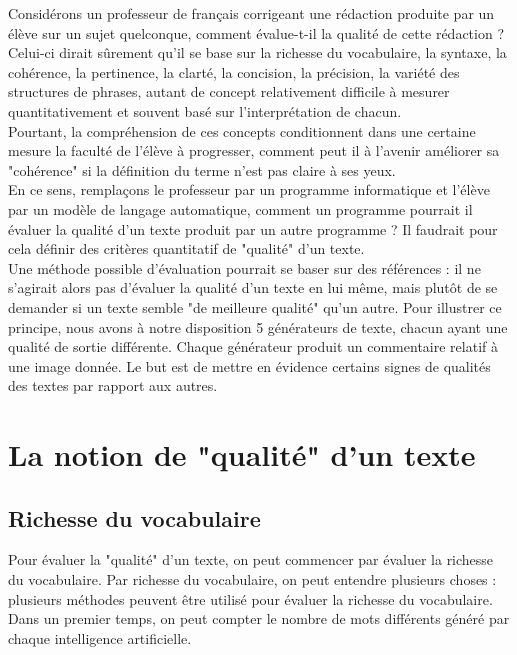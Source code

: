 \documentclass[conference]{IEEEtran}
\begin{document}
Considérons un professeur de français corrigeant une rédaction produite par un élève sur un sujet quelconque, comment évalue-t-il la qualité de cette rédaction ? 
Celui-ci dirait sûrement qu'il se base sur la richesse du vocabulaire, la syntaxe, la cohérence, la pertinence, la clarté, la concision, la précision, la variété des structures de phrases, autant de concept relativement difficile à mesurer quantitativement et souvent basé sur l'interprétation de chacun. \\

Pourtant, la compréhension de ces concepts conditionnent dans une certaine mesure la faculté de l'élève à progresser, comment peut il à l'avenir améliorer sa "cohérence" si la définition du terme n'est pas claire à ses yeux.\\

En ce sens, remplaçons le professeur par un programme informatique et l'élève par un modèle de langage automatique, comment un programme pourrait il évaluer la qualité d'un texte produit par un autre programme ?
Il faudrait pour cela définir des critères quantitatif de "qualité" d'un texte.\\

Une méthode possible d'évaluation pourrait se baser sur des références : il ne s'agirait alors pas d'évaluer la qualité d'un texte en lui même, mais plutôt de se demander si un texte semble "de meilleure qualité" qu'un autre.
Pour illustrer ce principe, nous avons à notre disposition 5 générateurs de texte, chacun ayant une qualité de sortie différente. Chaque générateur produit un commentaire relatif à une image donnée.
Le but est de mettre en évidence certains signes de qualités des textes par rapport aux autres.

\section {La notion de "qualité" d'un texte}

\subsection {Richesse du vocabulaire}

Pour évaluer la "qualité" d'un texte, on peut commencer par évaluer la richesse du vocabulaire. 
Par richesse du vocabulaire, on peut entendre plusieurs choses : plusieurs méthodes peuvent être utilisé pour évaluer la richesse du vocabulaire. 
Dans un premier temps, on peut compter le nombre de mots différents généré par chaque intelligence artificielle. 
\end{document}

